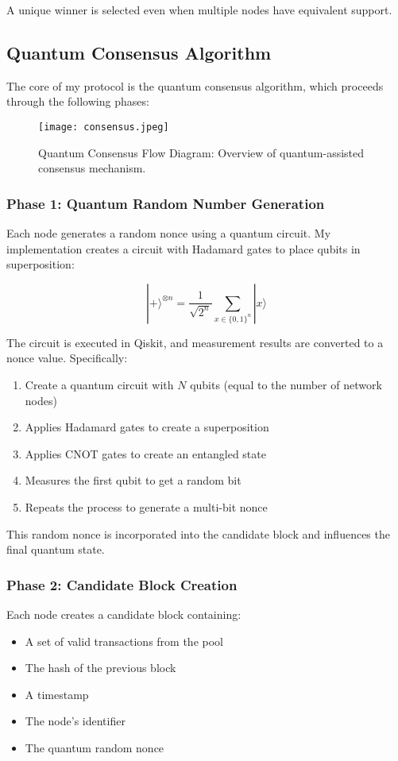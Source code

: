 \documentclass[11pt,a4paper]{article}
\begin{document}
A unique winner is selected even when multiple nodes have equivalent support.

\subsection{Quantum Consensus Algorithm}
The core of my protocol is the quantum consensus algorithm, which proceeds through the following phases:

\begin{figure}[htbp]
  \centering
  \texttt{[image: consensus.jpeg]}
  \caption{Quantum Consensus Flow Diagram: Overview of quantum-assisted consensus mechanism.}
  \label{fig:consensus_flow}
\end{figure}

\subsubsection{Phase 1: Quantum Random Number Generation}
Each node generates a random nonce using a quantum circuit. My implementation creates a circuit with Hadamard gates to place qubits in superposition:

\begin{equation}
|+\rangle^{\otimes n} = \frac{1}{\sqrt{2^n}}\sum_{x \in \{0,1\}^n} |x\rangle
\end{equation}

The circuit is executed in Qiskit, and measurement results are converted to a nonce value. Specifically:

\begin{enumerate}
    \item Create a quantum circuit with $N$ qubits (equal to the number of network nodes)
    \item Applies Hadamard gates to create a superposition
    \item Applies CNOT gates to create an entangled state
    \item Measures the first qubit to get a random bit
    \item Repeats the process to generate a multi-bit nonce
\end{enumerate}

This random nonce is incorporated into the candidate block and influences the final quantum state.

\subsubsection{Phase 2: Candidate Block Creation}
Each node creates a candidate block containing:
\begin{itemize}
    \item A set of valid transactions from the pool
    \item The hash of the previous block
    \item A timestamp
    \item The node's identifier
    \item The quantum random nonce
\end{itemize}
\end{document}
